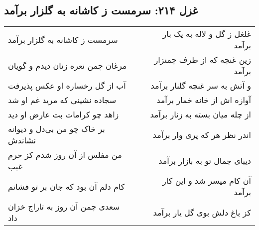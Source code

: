 \begin{center}
\section*{غزل ۲۱۴: سرمست ز کاشانه به گلزار برآمد}
\label{sec:214}
\begin{longtable}{l p{0.5cm} r}
سرمست ز کاشانه به گلزار برآمد
&&
غلغل ز گل و لاله به یک بار برآمد
\\
مرغان چمن نعره زنان دیدم و گویان
&&
زین غنچه که از طرف چمنزار برآمد
\\
آب از گل رخساره او عکس پذیرفت
&&
و آتش به سر غنچه گلنار برآمد
\\
سجاده نشینی که مرید غم او شد
&&
آوازه اش از خانه خمار برآمد
\\
زاهد چو کرامات بت عارض او دید
&&
از چله میان بسته به زنار برآمد
\\
بر خاک چو من بی‌دل و دیوانه نشاندش
&&
اندر نظر هر که پری وار برآمد
\\
من مفلس از آن روز شدم کز حرم غیب
&&
دیبای جمال تو به بازار برآمد
\\
کام دلم آن بود که جان بر تو فشانم
&&
آن کام میسر شد و این کار برآمد
\\
سعدی چمن آن روز به تاراج خزان داد
&&
کز باغ دلش بوی گل یار برآمد
\\
\end{longtable}
\end{center}
